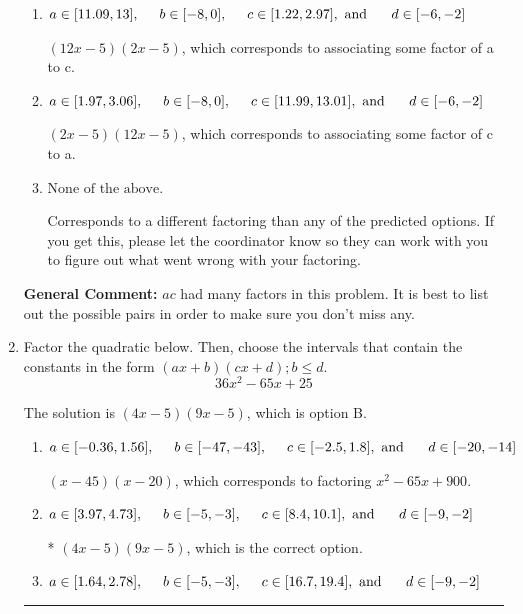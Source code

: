 \documentclass{extbook}[14pt]
\newcommand{\litem}[1]{\item #1

\rule{\textwidth}{0.4pt}}
\begin{document}
\begin{enumerate}
{\begin{enumerate}[label=\Alph*.]
* $(4x -5)(6x -5)$, which is the correct option.
\item \( a \in [11.09, 13], \hspace*{5mm} b \in [-8, 0], \hspace*{5mm} c \in [1.22, 2.97], \text{ and } \hspace*{5mm} d \in [-6, -2] \)

 $(12x -5)(2x -5)$, which corresponds to associating some factor of a to c.
\item \( a \in [1.97, 3.06], \hspace*{5mm} b \in [-8, 0], \hspace*{5mm} c \in [11.99, 13.01], \text{ and } \hspace*{5mm} d \in [-6, -2] \)

 $(2x -5)(12x -5)$, which corresponds to associating some factor of c to a.
\item \( \text{None of the above.} \)

 Corresponds to a different factoring than any of the predicted options. If you get this, please let the coordinator know so they can work with you to figure out what went wrong with your factoring.
\end{enumerate}

\textbf{General Comment:} $ac$ had many factors in this problem. It is best to list out the possible pairs in order to make sure you don't miss any.
}
\litem{
Factor the quadratic below. Then, choose the intervals that contain the constants in the form $(ax+b)(cx+d); b \leq d.$
\[ 36x^{2} -65 x + 25 \]

The solution is \( (4x -5)(9x -5) \), which is option B.\begin{enumerate}[label=\Alph*.]
\item \( a \in [-0.36, 1.56], \hspace*{5mm} b \in [-47, -43], \hspace*{5mm} c \in [-2.5, 1.8], \text{ and } \hspace*{5mm} d \in [-20, -14] \)

 $(x -45)(x -20)$, which corresponds to factoring $x^{2} -65 x + 900$.
\item \( a \in [3.97, 4.73], \hspace*{5mm} b \in [-5, -3], \hspace*{5mm} c \in [8.4, 10.1], \text{ and } \hspace*{5mm} d \in [-9, -2] \)

* $(4x -5)(9x -5)$, which is the correct option.
\item \( a \in [1.64, 2.78], \hspace*{5mm} b \in [-5, -3], \hspace*{5mm} c \in [16.7, 19.4], \text{ and } \hspace*{5mm} d \in [-9, -2] \)


\end{enumerate}}
\end{enumerate}
\end{document}
